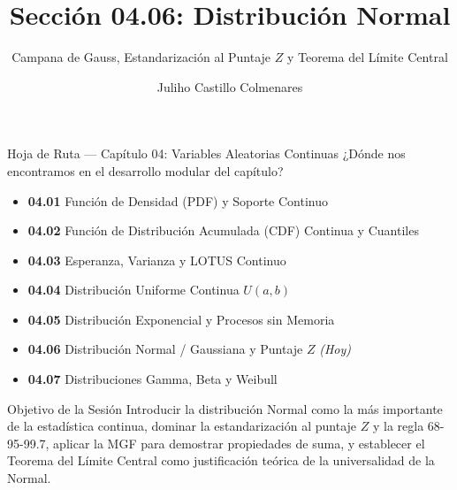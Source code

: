 \documentclass[10pt, aspectratio=169]{beamer}
\title[Distribución Normal]{Sección 04.06: Distribución Normal}
\subtitle{Campana de Gauss, Estandarización al Puntaje $Z$ y Teorema del Límite Central}
\author[J. Castillo Colmenares]{Juliho Castillo Colmenares}
\institute{Tecnológico de Monterrey}
\date{\vspace{-1.2cm}}
\begin{document}
\begin{frame}[plain]
  \titlepage
\end{frame}

\begin{frame}{Hoja de Ruta --- Capítulo 04: Variables Aleatorias Continuas}
  \footnotesize
  ¿Dónde nos encontramos en el desarrollo modular del capítulo? \pause
  \begin{itemize}\itemsep=0.08em
    \item \textbf{04.01} Función de Densidad (PDF) y Soporte Continuo \pause
    \item \textbf{04.02} Función de Distribución Acumulada (CDF) Continua y Cuantiles \pause
    \item \textbf{04.03} Esperanza, Varianza y LOTUS Continuo \pause
    \item \textbf{04.04} Distribución Uniforme Continua $U(a, b)$ \pause
    \item \textbf{04.05} Distribución Exponencial y Procesos sin Memoria \pause
    \item \textbf{04.06} Distribución Normal / Gaussiana y Puntaje $Z$ \emph{(Hoy)} \pause
    \item \textbf{04.07} Distribuciones Gamma, Beta y Weibull
  \end{itemize}
  \vspace{-0.05cm}
  \begin{block}{Objetivo de la Sesión}
    Introducir la distribución Normal como la más importante de la estadística continua, dominar la estandarización al puntaje $Z$ y la regla 68-95-99.7, aplicar la MGF para demostrar propiedades de suma, y establecer el Teorema del Límite Central como justificación teórica de la universalidad de la Normal.
  \end{block}
\end{frame}
\end{document}
